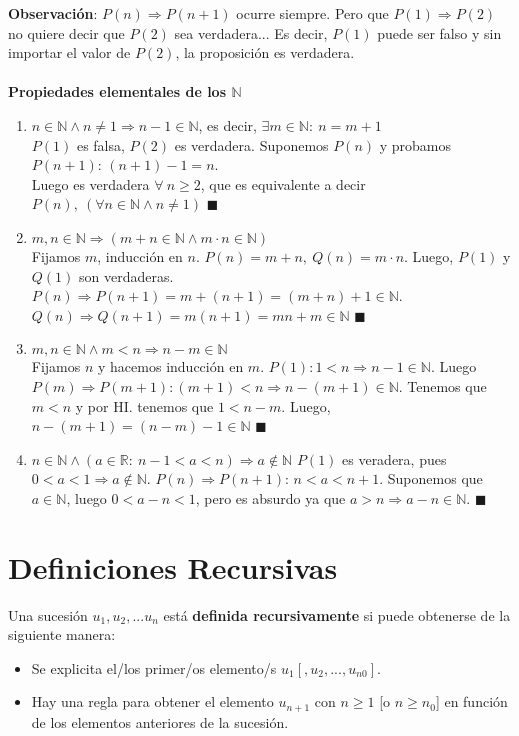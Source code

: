 \documentclass[11pt,a4paper]{article}
\newcommand*{\QEDA}{\null\nobreak\hfill\ensuremath{\blacksquare}}
\begin{document}
\noindent \textbf{Observaci\'on}: $P(n) \Rightarrow P(n+1)$ ocurre siempre. Pero que $P(1)\Rightarrow P(2)$ no quiere decir que $P(2)$ sea verdadera... Es decir, $P(1)$ puede ser falso y sin importar el valor de $P(2)$, la proposici\'on es verdadera.\\ \\


\noindent \textbf{Propiedades elementales de los $\mathbb{N}$}
\begin{enumerate}
\item $n\in\mathbb{N} \land n\not=1 \Rightarrow n-1 \in \mathbb{N}$, es decir, $\exists m \in \mathbb{N}:\ n=m+1$\\
$P(1)$ es falsa, $P(2)$ es verdadera. Suponemos $P(n)$ y probamos $P(n+1)$: $(n+1)-1=n$.\\ Luego es verdadera $\forall\ n\geq2$, que es equivalente a decir $P(n),\ (\forall n \in \mathbb{N} \land n\not=1)$ \QEDA
\item $m,n\in\mathbb{N} \Rightarrow (m+n\in\mathbb{N} \land m\cdot n \in \mathbb{N})$\\
Fijamos $m$, inducci\'on en $n$. $P(n) = m + n,\ Q(n) = m\cdot n$. Luego, $P(1)$ y $Q(1)$ son verdaderas. $P(n)\Rightarrow P(n+1) = m+(n+1) = (m+n)+1 \in \mathbb{N}$.\\ $Q(n)\Rightarrow Q(n+1)  = m(n+1) = mn+m \in \mathbb{N}$ \QEDA
\item $m,n\in\mathbb{N} \land m<n \Rightarrow n-m\in\mathbb{N}$\\
Fijamos $n$ y hacemos inducci\'on en $m$. $P(1): 1<n \Rightarrow n-1\in\mathbb{N}$. Luego $P(m)\Rightarrow P(m+1): (m+1)<n \Rightarrow n-(m+1) \in \mathbb{N}$. Tenemos que $m<n$ y por HI. tenemos que $1<n-m$. Luego, $n-(m+1) = (n-m)-1 \in \mathbb{N}$ \QEDA
\item $n\in\mathbb{N} \land (a\in\mathbb{R}:\ n-1<a<n) \Rightarrow a\not\in\mathbb{N}$
$P(1)$ es veradera, pues $0<a<1 \Rightarrow a \not \in \mathbb{N}$. $P(n)\Rightarrow P(n+1)$: $n<a<n+1$. Suponemos que $a\in\mathbb{N}$, luego $0<a-n<1$, pero es absurdo ya que $a>n\Rightarrow a-n \in \mathbb{N}$. \QEDA 
\end{enumerate}

\section{Definiciones Recursivas}
\noindent Una sucesi\'on $u_1, u_2, ... u_n$ est\'a \textbf{definida recursivamente} si puede obtenerse de la siguiente manera:
\begin{itemize}
\item Se explicita el/los primer/os elemento/s $u_1 [, u_2, ..., u_{n0}]$.
\item Hay una regla para obtener el elemento $u_{n+1}$ con $n\geq1$ [o $n\geq n_0$] en funci\'on de los elementos anteriores de la sucesi\'on.
\end{itemize}
\end{document}
